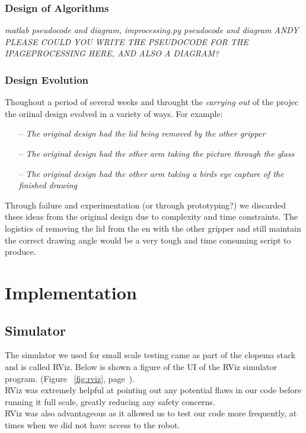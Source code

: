 \documentclass{l3proj}
\begin{document}
 
\subsection{Design of Algorithms}
\textit{matlab pseudocode and diagram, improcessing.py pseudocode and diagram
 ANDY PLEASE COULD YOU WRITE THE PSEUDOCODE FOR THE IPAGEPROCESSING HERE, AND ALSO A DIAGRAM?}

\subsection{Design Evolution}
Thoughout a period of several weeks and throught the \textit{carrying out} of the projec the oriinal design evolved in a variety of ways. For example: 
\begin{itemize}
\item[--] \textit{The original design had the lid being removed by the other gripper}
\item[--] \textit{The original design had the other arm taking the picture through the glass}
\item[--] \textit{The original design had the other arm taking a birds eye capture of the finished drawing}
\end {itemize}
Through failure and experimentation (or through prototyping?) we discarded thses ideas from the original design due to complexity and time constraints. The logistics of removing the lid from the en with the other gripper and still maintain the correct drawing angle would be a very tough and time consuming script to produce. \\


\chapter{Implementation}
\section{Simulator}
The simulator we used for small scale testing came as part of the \acrshort{clopema} stack and is called RViz. Below is shown a figure of the UI of the RViz simulator program. (Figure ~\ref{fig:rviz}, page~\pageref{fig:rviz}).\\
RViz was extremely helpful at pointing out any potential flaws in our code before running it full scale, greatly reducing any safety concerns.\\
RViz was also advantageous as it allowed us to test our code more frequently, at times when we did not have access to the robot.
\end{document}
